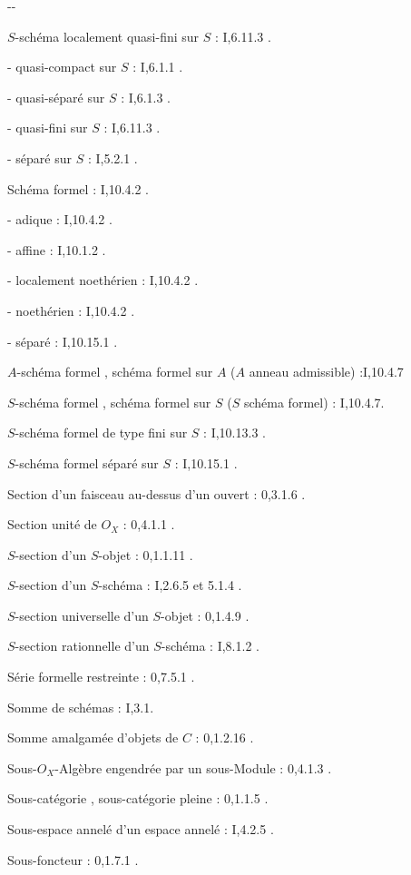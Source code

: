 \begin{center}-\qquad -\end{center}

$S$-schéma localement quasi-fini sur $S$ : I,6.11.3 .

- quasi-compact sur $S$ : I,6.1.1 .

- quasi-séparé sur $S$ : I,6.1.3 .

- quasi-fini sur $S$ :  I,6.11.3 .

- séparé sur $S$ : I,5.2.1 .

 Schéma formel : I,10.4.2 .

- adique : I,10.4.2 .

- affine : I,10.1.2 .

- localement noethérien : I,10.4.2 .

- noethérien : I,10.4.2 .

- séparé : I,10.15.1 .

$A$-schéma formel , schéma formel sur $A$ ($A$ anneau admissible) :I,10.4.7

$S$-schéma formel , schéma formel sur $S$ ($S$ schéma formel) : I,10.4.7.

$S$-schéma formel de type fini sur $S$ : I,10.13.3 .

$S$-schéma formel séparé sur $S$ : I,10.15.1 .

Section d'un faisceau au-dessus d'un ouvert : 0,3.1.6 .

Section unité de $O_X$ : 0,4.1.1 .

$S$-section d'un $S$-objet : 0,1.1.11 .

$S$-section d'un $S$-schéma : I,2.6.5 et 5.1.4 .

$S$-section universelle d'un $S$-objet : 0,1.4.9 .

$S$-section rationnelle d'un $S$-schéma : I,8.1.2 .

Série formelle restreinte : 0,7.5.1 .

Somme de schémas :  I,3.1.

Somme amalgamée d'objets de \uline{$C$} : 0,1.2.16 .

Sous-$O_X$-Algèbre engendrée par un sous-Module : 0,4.1.3 .

Sous-catégorie , sous-catégorie  pleine : 0,1.1.5 .

Sous-espace annelé d'un espace annelé : I,4.2.5 .

 Sous-foncteur : 0,1.7.1 .

